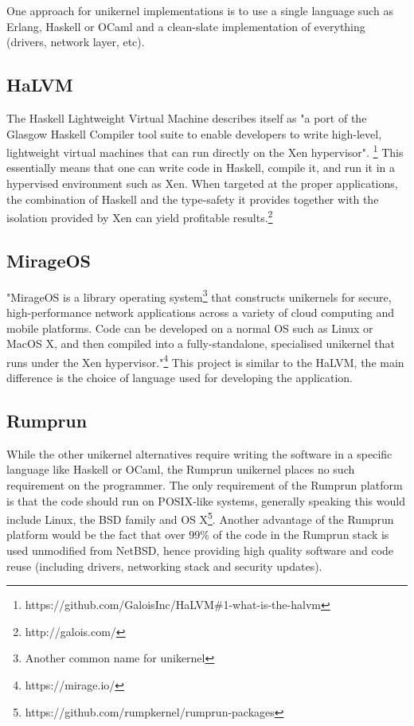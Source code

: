 \documentclass[10pt,a4paper,twoside]{article}
\begin{document}
One approach for unikernel implementations is to use a single language such as Erlang, Haskell or OCaml and a clean-slate implementation of everything (drivers, network layer, etc).\cite{RumpComparison}

\subsection{HaLVM}

The Haskell Lightweight Virtual Machine describes itself as
"a port of the Glasgow Haskell Compiler tool suite to enable developers to write high-level,
lightweight virtual machines that can run directly on the Xen hypervisor".
\footnote{https://github.com/GaloisInc/HaLVM\#1-what-is-the-halvm}
This essentially means that one can write code in Haskell, compile it, and run it in a hypervised environment
such as Xen. When targeted at the proper applications, the combination of Haskell and the type-safety it provides
together with the isolation provided by Xen can yield profitable results.\footnote{http://galois.com/}

\subsection{MirageOS}
"MirageOS is a library operating system\footnote{Another common name for unikernel} that constructs unikernels for secure, high-performance network applications across a variety of cloud computing and mobile platforms. Code can be developed on a normal OS such as Linux or MacOS X, and then compiled into a fully-standalone, specialised unikernel that runs under the Xen hypervisor."\footnote{https://mirage.io/} This project is similar to the HaLVM, the main difference is the choice of language used for developing the application.

\subsection{Rumprun}
While the other unikernel alternatives require writing the software in a specific language like Haskell or OCaml, the Rumprun unikernel places no such requirement on the programmer. The only requirement of the Rumprun platform is that the code should run on POSIX-like systems, generally speaking this would include Linux, the BSD family and OS X\footnote{https://github.com/rumpkernel/rumprun-packages}. Another advantage of the Rumprun platform would be the fact that over 99\% of the code in the Rumprun stack is used unmodified from NetBSD, hence providing high quality software and code reuse (including drivers, networking stack and security updates).\cite{RumpComparison}
\end{document}
